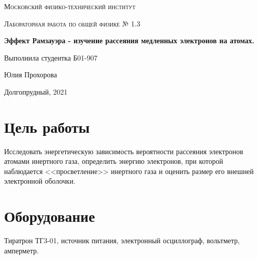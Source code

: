 \documentclass[a4paper]{article}
\begin{document}
\newcommand{\apple}{\char"F8FF}

\begin{titlepage}
  \vspace*{4cm}
\centering
  {\scshape\LARGE Московский физико-технический институт\par}
\vspace{1cm}
{\scshape\Large Лабораторная работа по общей физике № 1.3\par}
\vspace{1cm}
  {\huge\bfseries  Эффект Рамзауэра - изучение рассеяния медленных электронов на атомах.\par}
\vspace{2cm}
\vfill
\begin{flushright}
{\large Выполнила студентка Б01-907}\par
\vspace{0.3cm}
{\LARGE Юлия Прохорова}
\end{flushright}

\vfill
Долгопрудный, 2021
\end{titlepage}

\pagestyle{fancy} 
\fancyhead[C]{}
\fancyfoot[C]{ \noindent\rule{\textwidth}{0.4pt} \thepage }

\tableofcontents

\newpage

\section{Цель работы} Исследовать энергетическую зависимость вероятности рассеяния электронов атомами инертного газа,
 определить энергию электронов, при которой наблюдается <<просветление>> инертного газа и оценить размер его внешней электронной оболочки.

\section{Оборудование} Тиратрон ТГ3-01, источник питания, электронный осциллограф, вольтметр, амперметр.
\end{document}
